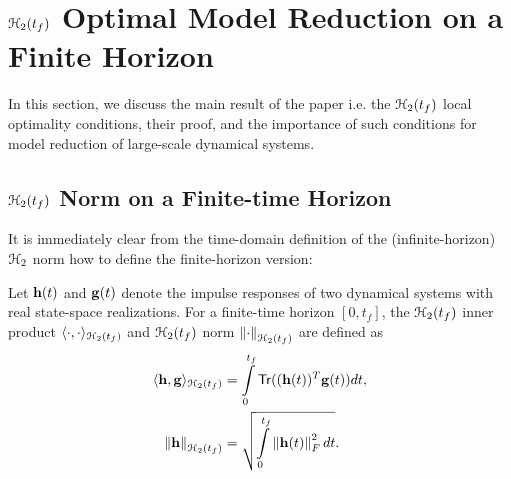 \documentclass[twocolumn]{autart}
\begin{document}
\section{$\EuScript{H}_2(t_f)$ Optimal Model Reduction on a Finite Horizon}  \label{sec:main} 
%
{\color{red}
In this section, we discuss the main result of the paper i.e. the $\EuScript{H}_2(t_f)$ local optimality conditions, their proof, and the importance of such conditions for model reduction of large-scale dynamical systems.}



  
\subsection{$\EuScript{H}_2(t_f)$ Norm on a Finite-time Horizon}
It is immediately clear from the time-domain definition of the (infinite-horizon) $\EuScript{H}_2$ norm how to define the finite-horizon version:
\begin{Definition}\label{innerh2}
Let $\mathbf{h}(t)$ and $\mathbf{g}(t)$ denote the impulse responses of two dynamical systems with real state-space realizations.  
For a finite-time horizon 
$[0,t_f]$, the $\EuScript{H}_2(t_f)$ inner product $\langle \cdot, \cdot \rangle_{\EuScript{H}_2(t_f)}$ 
and $\EuScript{H}_2(t_f)$ norm $\left\lVert\cdot\right\rVert_{\EuScript{H}_2(t_f)}$ are defined as  
\begin{align*}
\langle \h, \g \rangle_{\ch_2(\tf)} &=\int_0^{\tf} \mathsf{Tr}( (\h(t))^T \g(t)) dt, \\%
\norm{\h}_{\ch_2(\tf)} &=\sqrt{\int_0^{\tf} \norm{\h(t)}_F^2 dt}.
\end{align*}

\end{Definition}

\end{document}
